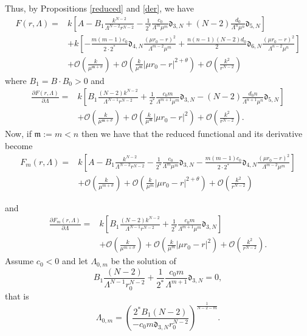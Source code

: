 \documentclass[11pt,a4paper]{amsart}
\begin{document}
Thus, by Propositions \ref{reduced} and \ref{der}, we have
$$\begin{aligned} F(r, \Lambda)=&k\left[A-B_1\frac{k^{N-2}}{\Lambda^{N-2}r^{N-2}}-\frac{1}{2^*}\frac{c_0}{\Lambda^m \mu^m}\mathfrak d_{3, N}+(N-2)\frac{d_0}{\Lambda^n \mu^n}\mathfrak d_{5, N}\right]\\
&+k\left[-\frac{m(m-1)c_0}{2\cdot2^*}\mathfrak d_{4, N}\frac{(\mu r_0-r)^2}{\Lambda^{m-2}\mu^m}+\frac{n(n-1)(N-2)d_0}{2}\mathfrak d_{6, N}\frac{(\mu r_0-r)^2}{\Lambda^{n-2}\mu^n}\right]\\
&+\mathcal O\left(\frac{k}{\mu^{\mathfrak m+\sigma}}\right)  +\mathcal O\left(\frac{k}{\mu^{\mathfrak m}}|\mu r_0-r|^{2+\theta}\right)+\mathcal O\left(\frac{k^2}{r^{N-2}}\right)
\end{aligned}$$
where $B_1=B\cdot B_0>0$
and
$$\begin{aligned} \frac{\partial F(r, \Lambda)}{\partial\Lambda}=&k\left[B_1\frac{(N-2)k^{N-2}}{\Lambda^{N-1}r^{N-2}}+\frac{1}{2^*}\frac{c_0m}{\Lambda^{m+1} \mu^m}\mathfrak d_{3, N}-(N-2)\frac{d_0n}{\Lambda^{n+1} \mu^n}\mathfrak d_{5, N}\right]\\
&+\mathcal O\left(\frac{k}{\mu^{\mathfrak m+\sigma}}\right)  +\mathcal O\left(\frac{k}{\mu^{\mathfrak m}}|\mu r_0-r|^{2}\right)+\mathcal O\left(\frac{k^2}{r^{N-2}}\right).
\end{aligned}$$
Now, if $\mathfrak m:=m<n$ then we have that the reduced functional and its derivative become
$$\begin{aligned} F_m(r, \Lambda)=&k\left[A-B_1\frac{k^{N-2}}{\Lambda^{N-2}r^{N-2}}-\frac{1}{2^*}\frac{c_0}{\Lambda^m \mu^m}\mathfrak d_{3, N}-\frac{m(m-1)c_0}{2\cdot2^*}\mathfrak d_{4, N}\frac{(\mu r_0-r)^2}{\Lambda^{m-2}\mu^m}\right]\\
&+\mathcal O\left(\frac{k}{\mu^{m+\sigma}}\right)  +\mathcal O\left(\frac{k}{\mu^{m}}|\mu r_0-r|^{2+\theta}\right)+\mathcal O\left(\frac{k^2}{r^{N-2}}\right)
\end{aligned}$$

and
$$\begin{aligned} \frac{\partial F_m(r, \Lambda)}{\partial\Lambda}=&k\left[B_1\frac{(N-2)k^{N-2}}{\Lambda^{N-1}r^{N-2}}+\frac{1}{2^*}\frac{c_0m}{\Lambda^{m+1} \mu^m}\mathfrak d_{3, N}\right]\\
&+\mathcal O\left(\frac{k}{\mu^{m+\sigma}}\right)  +\mathcal O\left(\frac{k}{\mu^{m}}|\mu r_0-r|^{2}\right)+\mathcal O\left(\frac{k^2}{r^{N-2}}\right).
\end{aligned}$$
Assume $c_0<0$ and  let $\Lambda_{0, m}$ be the solution of
\[
B_1\frac{(N-2)}{\Lambda^{N-1}r^{N-2}_0}+\frac{1}{2^*}\frac{c_0m}{\Lambda^{m+1} }\mathfrak d_{3, N}=0,
\]
that is
\[
\Lambda_{0, m}=\left(\frac{2^*B_1(N-2)}{-c_0m \mathfrak d_{3, N}r_{0}^{N-2}}\right)^{\frac{1}{N-2-m}}.
\]
\end{document}

